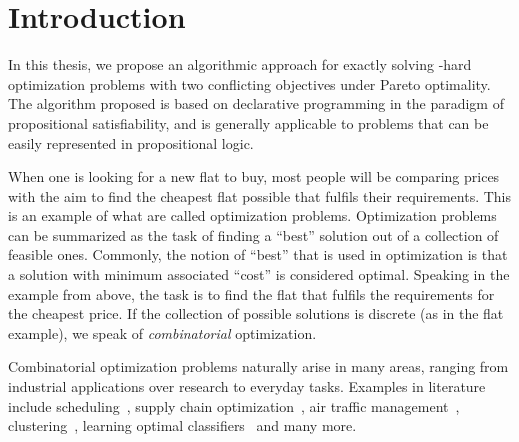 \chapter{Introduction\label{chap:intro}}

In this thesis, we propose an algorithmic approach for exactly solving \NP-hard optimization problems with two conflicting objectives under Pareto optimality.
The algorithm proposed is based on declarative programming in the paradigm of propositional satisfiability, and is generally applicable to problems that can be easily represented in propositional logic.

When one is looking for a new flat to buy, most people will be comparing prices with the aim to find the cheapest flat possible that fulfils their requirements.
This is an example of what are called optimization problems.
Optimization problems can be summarized as the task of finding a ``best'' solution out of a collection of feasible ones.
Commonly, the notion of ``best'' that is used in optimization is that a solution with minimum associated ``cost'' is considered optimal.
Speaking in the example from above, the task is to find the flat that fulfils the requirements for the cheapest price.
If the collection of possible solutions is discrete (as in the flat example), we speak of \emph{combinatorial} optimization.

Combinatorial optimization problems naturally arise in many areas, ranging from industrial applications over research to everyday tasks.
Examples in literature include scheduling~\autocites{DBLP:conf/cp/Stojadinovic14,DBLP:conf/cpaior/BofillGSV15,DBLP:journals/ior/Solomon87,DBLP:journals/candie/AkyolB07}, supply chain optimization~\autocite{DBLP:journals/cce/Papageorgiou09}, air traffic management~\autocites{DBLP:journals/ior/BertsimasLO11,RichardsHow2002Aircrafttrajectoryplanning}, clustering~\autocite{DBLP:journals/ai/DaoDV17,DBLP:conf/sdm/DavidsonRS10}, learning optimal classifiers~\autocites{DBLP:conf/cp/MaliotovM18,DBLP:conf/ijcai/NarodytskaIPM18,DBLP:conf/ijcai/Hu0HH20,DBLP:conf/cp/YuISB20,DBLP:conf/aaai/DemirovicS21,DBLP:conf/cp/ShatiCM21,DBLP:conf/cade/IgnatievPNM18} and many more.

